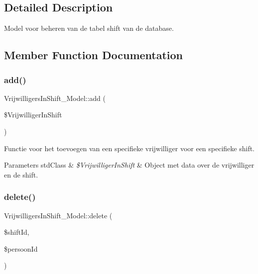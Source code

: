 \subsection{Detailed Description}
Model voor beheren van de tabel shift van de database. 

\subsection{Member Function Documentation}
\mbox{\label{class_vrijwilligers_in_shift___model_ace0abb83991ff90729515c3e86c0a3ac}} 
\subsubsection{\texorpdfstring{add()}{add()}}
{\footnotesize\ttfamily Vrijwilligers\+In\+Shift\+\_\+\+Model\+::add (\begin{DoxyParamCaption}\item[{}]{\$\+Vrijwilliger\+In\+Shift }\end{DoxyParamCaption})}

Functie voor het toevoegen van een specifieke vrijwilliger voor een specifieke shift. 
\begin{DoxyParams}[1]{Parameters}
std\+Class & {\em \$\+Vrijwilliger\+In\+Shift} & Object met data over de vrijwilliger en de shift. \\
\hline
\end{DoxyParams}
\mbox{\label{class_vrijwilligers_in_shift___model_a62d1d1920e3c5a73f117ad9293260d67}} 
\subsubsection{\texorpdfstring{delete()}{delete()}}
{\footnotesize\ttfamily Vrijwilligers\+In\+Shift\+\_\+\+Model\+::delete (\begin{DoxyParamCaption}\item[{}]{\$shift\+Id,  }\item[{}]{\$persoon\+Id }\end{DoxyParamCaption})}

